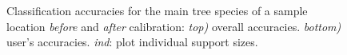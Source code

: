 \begin{figure}[H]
	\centering
	\caption{Classification accuracies for the main tree species of a sample location \textit{before} and \textit{after} calibration: \textit{top)} overall accuracies. \textit{bottom)} user's accuracies. \textit{ind}: plot individual support sizes.}
	\label{fig:cos_oaa_ua}
\end{figure}


